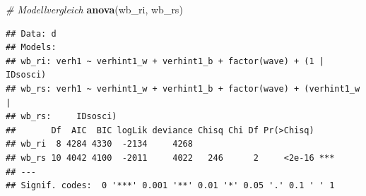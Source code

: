 \documentclass[
]{book}
\newenvironment{Shaded}{\begin{snugshade}}{\end{snugshade}}
\newcommand{\CommentTok}[1]{\textcolor[rgb]{0.56,0.35,0.01}{\textit{#1}}}
\newcommand{\DataTypeTok}[1]{\textcolor[rgb]{0.13,0.29,0.53}{#1}}
\newcommand{\KeywordTok}[1]{\textcolor[rgb]{0.13,0.29,0.53}{\textbf{#1}}}
\newcommand{\NormalTok}[1]{#1}
\newcommand{\OperatorTok}[1]{\textcolor[rgb]{0.81,0.36,0.00}{\textbf{#1}}}
\newcommand{\OtherTok}[1]{\textcolor[rgb]{0.56,0.35,0.01}{#1}}
\newcommand{\StringTok}[1]{\textcolor[rgb]{0.31,0.60,0.02}{#1}}
\begin{document}
\begin{Shaded}
\begin{Highlighting}[]
\CommentTok{# Modellvergleich}
\KeywordTok{anova}\NormalTok{(wb_ri, wb_rs)}
\end{Highlighting}
\end{Shaded}

\begin{verbatim}
## Data: d
## Models:
## wb_ri: verh1 ~ verhint1_w + verhint1_b + factor(wave) + (1 | IDsosci)
## wb_rs: verh1 ~ verhint1_w + verhint1_b + factor(wave) + (verhint1_w | 
## wb_rs:     IDsosci)
##       Df  AIC  BIC logLik deviance Chisq Chi Df Pr(>Chisq)    
## wb_ri  8 4284 4330  -2134     4268                            
## wb_rs 10 4042 4100  -2011     4022   246      2     <2e-16 ***
## ---
## Signif. codes:  0 '***' 0.001 '**' 0.01 '*' 0.05 '.' 0.1 ' ' 1
\end{verbatim}

\begin{Shaded}
\end{Shaded}
\end{document}
